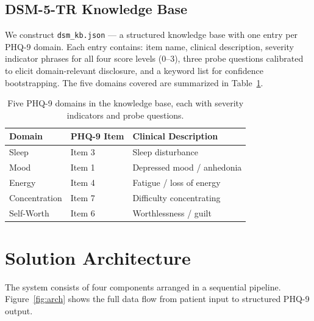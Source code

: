 \documentclass[11pt,twocolumn]{article}
\begin{document}
\subsection{DSM-5-TR Knowledge Base}

We construct \texttt{dsm\_kb.json} — a structured knowledge base with one entry per PHQ-9 domain. Each entry contains: item name, clinical description, severity indicator phrases for all four score levels (0--3), three probe questions calibrated to elicit domain-relevant disclosure, and a keyword list for confidence bootstrapping. The five domains covered are summarized in Table~\ref{tab:domains}.

\begin{table}[h]
\centering\small
\begin{tabular}{lll}
\toprule
\textbf{Domain} & \textbf{PHQ-9 Item} & \textbf{Clinical Description} \\
\midrule
Sleep      & Item 3 & Sleep disturbance \\
Mood       & Item 1 & Depressed mood / anhedonia \\
Energy     & Item 4 & Fatigue / loss of energy \\
Concentration & Item 7 & Difficulty concentrating \\
Self-Worth & Item 6 & Worthlessness / guilt \\
\bottomrule
\end{tabular}
\caption{Five PHQ-9 domains in the knowledge base, each with severity indicators and probe questions.}
\label{tab:domains}
\end{table}

\section{Solution Architecture}
\label{sec:arch}

The system consists of four components arranged in a sequential pipeline. Figure~\ref{fig:arch} shows the full data flow from patient input to structured PHQ-9 output.
\end{document}
